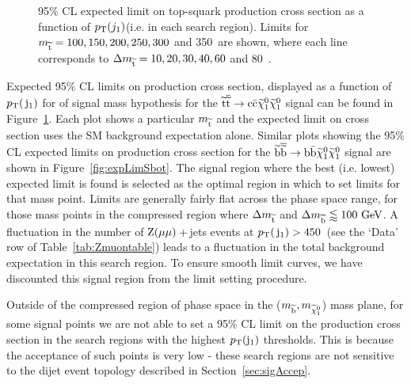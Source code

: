 \begin{figure}[!Ht]
\begin{center}
  \caption{95\% \ac{CL} expected limit on top-squark production cross section as a function of $p_{\text{T}}(j_{1})$\GeV (i.e. in each search region). Limits for $m_{\widetilde{{\rm t}}}=100,150,200,250,300$ and 350~\GeV are shown, where each line corresponds to $\Delta m_{\widetilde{{\rm t}}}=10,20,30,40,60$ and 80~\GeV.}
  \label{fig:expLimStop}
  \end{center}
\end{figure}

Expected 95\% \ac{CL} limits on production cross section, displayed as a function of $p_{\text{T}}(\,\mathrm{j}_1)$ for  of signal mass hypothesis for the $\widetilde{{\rm t}} \overline{\widetilde{\mathrm{t}}} \rightarrow \rm c \bar{\rm c} \widetilde{\chi}^{0}_{1} \widetilde{\chi}^{0}_{1}$ signal can be found in Figure~\ref{fig:expLimStop}. 
Each plot shows a particular $m_{\widetilde{{\rm t}}}$ and the expected limit on cross section uses the \ac{SM} background expectation alone. 
Similar plots showing the 95\% \ac{CL} expected limits on production cross section for the $\widetilde{{\rm b}} \overline{\widetilde{\mathrm{b}}} \rightarrow \rm b \bar{\rm b} \widetilde{\chi}^{0}_{1} \widetilde{\chi}^{0}_{1}$ signal are shown in 
Figure~\ref{fig:expLimSbot}.
The signal region where the best (i.e. lowest) expected limit is found is selected as the optimal region in which to set limits for that mass point.
Limits are generally fairly flat across the phase space range, for those mass points in the compressed region where $\Delta m_{\widetilde{{\rm t}}}$ and $\Delta m_{\widetilde{{\rm b}}} \lessapprox 100~\mathrm{GeV}$.
A fluctuation in the number of $\mathrm{Z} (\mu \mu)${}\,+\,jets events at $p_{\text{T}}(\,\mathrm{j}_1)>450$~\GeV (see the `Data' row of Table~\ref{tab:Zmuontable}) leads to a fluctuation in the total background expectation in this search region. 
To ensure smooth limit curves,  we have discounted this signal region from the limit setting procedure. 

Outside of the compressed region of phase space in the ($m_{\widetilde{{\rm b}}}, m_{\widetilde{\chi}^{0}_{1}}$) mass plane, for some signal points we are not able to set a 95\% \ac{CL} limit on the production cross section in the search regions with the highest $p_{\text{T}}({\rm j}_1)$ thresholds. 
This is because the acceptance of such points is very low - these search regions are not sensitive to the dijet event topology described in Section~\ref{sec:sigAccep}.

